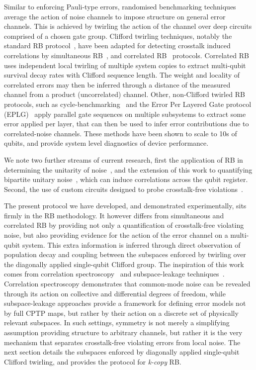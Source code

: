 Similar to enforcing Pauli-type errors, randomised benchmarking techniques average the action of noise channels to impose structure on general error channels. This is achieved by twirling the action of the channel over deep circuits comprised of a chosen gate group. Clifford twirling techniques, notably the standard RB protocol~\cite{magesan_scalable_2011,knill_randomized_2008,dankert_exact_2009}, have been adapted for detecting crosstalk induced correlations by simultaneous RB~\cite{gambetta_characterization_2012}, and correlated RB~\cite{mckay_correlated_2020} protocols.
Correlated RB uses independent local twirling of multiple system copies to extract multi-qubit survival decay rates with Clifford sequence length. The weight and locality of correlated errors may then be inferred through
a distance of the measured channel from a product (uncorrelated) channel.
Other, non-Clifford twirled RB protocols, such as cycle-benchmarking~\cite{erhard_characterizing_2019} and the Error Per Layered Gate protocol (EPLG)~\cite{mckay_benchmarking_2023-1} apply parallel gate sequences on multiple subsystems to extract some error applied per layer, that can then be used to infer error contributions due to correlated-noise channels. These methods have been shown to scale to 10s of qubits, and provide system level diagnostics of device performance.

We note two further streams of current research, first the application of RB in
determining the unitarity of noise~\cite{wallman_estimating_2015}, and the
extension of this work to quantifying bipartite unitary
noise~\cite{girling_estimation_2022}, which can induce correlations across the
qubit register. Second, the use of custom circuits designed to probe
crosstalk-free violations~\cite{rudinger_probing_2019,
sarovar_detecting_2020,gulacsi_characterizing_2025}. 

The present protocol we have developed, and demonstrated experimentally, sits firmly in the RB methodology. It however differs from simultaneous and correlated RB by providing not only a quantification of crosstalk-free violating noise, but also providing evidence for the action of the error channel on a multi-qubit system. This extra information is inferred through direct observation of population decay and coupling between the subspaces enforced by twirling over the diagonally applied single-qubit Clifford group.
The inspiration of this work comes from correlation spectroscopy~\cite{clements_lifetime-limited_2020, hainzer_correlation_2024}
and subspace-leakage techniques~\cite{sutherland_subspace_2025,helsen_new_2019}. Correlation spectroscopy demonstrates that common-mode noise can be
revealed through its action on collective and differential degrees of
freedom, while subspace-leakage approaches provide a framework for defining error models not by full CPTP maps, but rather by their action on a discrete set of physically relevant subspaces.
In such settings, symmetry is
not merely a simplifying assumption providing structure to arbitrary channels, but rather it is the very mechanism that separates
crosstalk-free violating errors from local noise. The next section details the subspaces enforced by diagonally applied single-qubit Clifford twirling, and provides the protocol for \emph{k-copy} RB.


